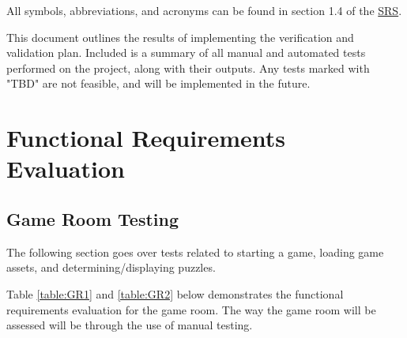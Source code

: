 \documentclass[12pt, titlepage]{article}
\begin{document}
\renewcommand{\arraystretch}{1.2}
All  symbols, abbreviations, and acronyms can be found in section 1.4 of the  \href{https://github.com/SammyG7/Mac-AR/blob/main/docs/SRS/SRS.pdf}{SRS}.


\newpage

\tableofcontents

\listoftables %

\newpage


This document outlines the results of implementing the verification and validation plan. Included is a summary of all manual and automated tests performed on the project, along with their outputs. Any tests marked with "TBD" are not feasible, and will be implemented in the future. 

\section{Functional Requirements Evaluation}

\subsection{Game Room Testing}
The following section goes over tests related to starting a game, loading game assets, and determining/displaying puzzles.


Table \ref{table:GR1} and \ref{table:GR2} below demonstrates the functional requirements evaluation for the game room. The way the game room will be assessed will be through the use of manual testing.
\end{document}
